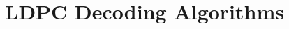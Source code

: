 \documentclass[../main.tex]{subfiles}
\begin{document}
\chapter{LDPC Decoding Algorithms}
\end{document}
